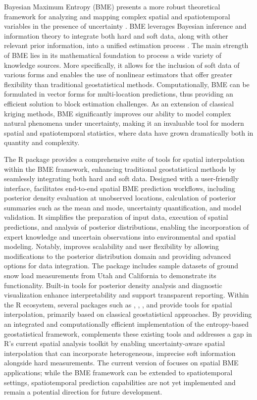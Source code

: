 Bayesian Maximum Entropy (BME) presents a more robust theoretical framework for analyzing and mapping complex spatial and spatiotemporal variables in the presence of uncertainty \citep{christakos1990bayesian, tang2016spatiotemporal, xu2022spatio}. BME leverages Bayesian inference and information theory to integrate both hard and soft data, along with other relevant prior information, into a unified estimation process \citep{christakos1998bayesian, christakos2000modern}. The main strength of BME lies in its mathematical foundation to process a wide variety of knowledge sources. More specifically, it allows for the inclusion of soft data of various forms and enables the use of nonlinear estimators that offer greater flexibility than traditional geostatistical methods. Computationally, BME can be formulated in vector forms for multi-location predictions, thus providing an efficient solution to block estimation challenges. As an extension of classical kriging methods, BME significantly improves our ability to model complex natural phenomena under uncertainty, making it an invaluable tool for modern spatial and spatiotemporal statistics, where data have grown dramatically both in quantity and complexity.

The  R \citep{R} package provides a comprehensive suite of tools for spatial interpolation within the BME framework, enhancing traditional geostatistical methods by seamlessly integrating both hard and soft data. Designed with a user-friendly interface,  facilitates end-to-end spatial BME prediction workflows, including posterior density evaluation at unobserved locations, calculation of posterior summaries such as the mean and mode, uncertainty quantification, and model validation. It simplifies the preparation of input data, execution of spatial predictions, and analysis of posterior distributions, enabling the incorporation of expert knowledge and uncertain observations into environmental and spatial modeling. Notably,  improves scalability and user flexibility by allowing modifications to the posterior distribution domain and providing advanced options for data integration. The package includes sample datasets of ground snow load measurements from Utah and California to demonstrate its functionality. Built-in tools for posterior density analysis and diagnostic visualization enhance interpretability and support transparent reporting. Within the R ecosystem, several packages such as , , , and  provide tools for spatial interpolation, primarily based on classical geostatistical approaches. By providing an integrated and computationally efficient implementation of the entropy-based geostatistical framework,  complements these existing tools and addresses a gap in R's current spatial analysis toolkit by enabling uncertainty-aware spatial interpolation that can incorporate heterogeneous, imprecise soft information alongside hard measurements. The current version of  focuses on spatial BME applications; while the BME framework can be extended to spatiotemporal settings, spatiotemporal prediction capabilities are not yet implemented and remain a potential direction for future development.

